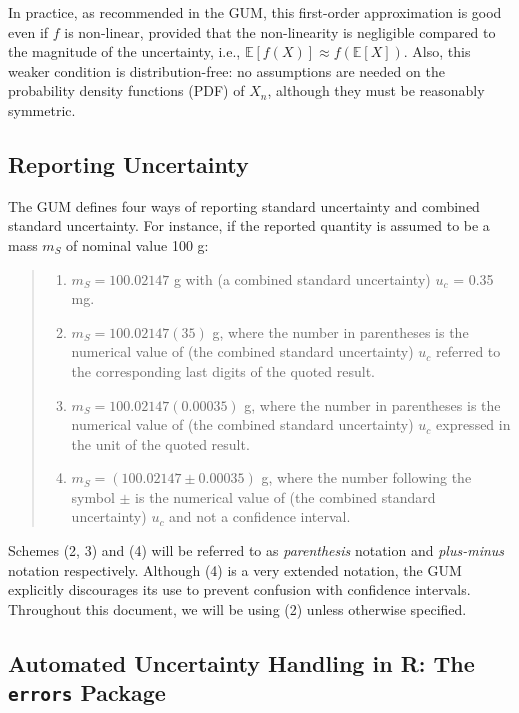 \documentclass[twoside,nohyper]{tufte-book}
\providecommand{\tightlist}{%
  \setlength{\itemsep}{0pt}\setlength{\parskip}{0pt}}
\theoremstyle{definition}
\theoremstyle{definition}
\theoremstyle{definition}
\theoremstyle{remark}
\begin{document}
In practice, as recommended in the GUM, this first-order approximation
is good even if \(f\) is non-linear, provided that the non-linearity is
negligible compared to the magnitude of the uncertainty, i.e.,
\(\mathbb{E}[f(X)]\approx f(\mathbb{E}[X])\). Also, this weaker
condition is distribution-free: no assumptions are needed on the
probability density functions (PDF) of \(X_n\), although they must be
reasonably symmetric.

\subsection{Reporting Uncertainty}\label{reporting-uncertainty}

The GUM defines four ways of reporting standard uncertainty and combined
standard uncertainty. For instance, if the reported quantity is assumed
to be a mass \(m_S\) of nominal value 100 g:

\begin{quote}
\begin{enumerate}
\def\labelenumi{\arabic{enumi}.}
\tightlist
\item
  \(m_S = 100.02147\) g with (a combined standard uncertainty) \(u_c\) =
  0.35 mg.
\item
  \(m_S = 100.02147(35)\) g, where the number in parentheses is the
  numerical value of (the combined standard uncertainty) \(u_c\)
  referred to the corresponding last digits of the quoted result.
\item
  \(m_S = 100.02147(0.00035)\) g, where the number in parentheses is the
  numerical value of (the combined standard uncertainty) \(u_c\)
  expressed in the unit of the quoted result.
\item
  \(m_S = (100.02147 \pm 0.00035)\) g, where the number following the
  symbol \(\pm\) is the numerical value of (the combined standard
  uncertainty) \(u_c\) and not a confidence interval.
\end{enumerate}
\end{quote}

Schemes (2, 3) and (4) will be referred to as \emph{parenthesis}
notation and \emph{plus-minus} notation respectively. Although (4) is a
very extended notation, the GUM explicitly discourages its use to
prevent confusion with confidence intervals. Throughout this document,
we will be using (2) unless otherwise specified.

\subsection{\texorpdfstring{Automated Uncertainty Handling in R: The
\texttt{errors}
Package}{Automated Uncertainty Handling in R: The errors Package}}\label{automated-uncertainty-handling-in-r-the-errors-package}
\end{document}
